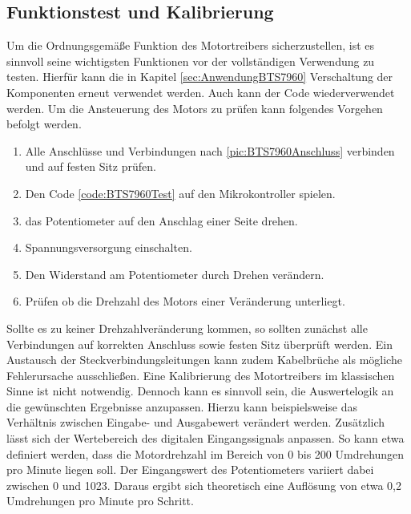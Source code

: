 \begin{center}
	\label{code:BTS7960Test}
\end{center}

\subsection{Funktionstest und Kalibrierung }
Um die Ordnungsgemäße Funktion des Motortreibers sicherzustellen, ist es sinnvoll seine wichtigsten Funktionen vor der vollständigen Verwendung zu testen. Hierfür kann die in Kapitel \ref{sec:AnwendungBTS7960} Verschaltung der Komponenten erneut verwendet werden. Auch kann der Code wiederverwendet werden. Um die Ansteuerung des Motors zu prüfen kann folgendes Vorgehen befolgt werden. 


\begin{center}
	\begin{enumerate}
		\item Alle Anschlüsse und Verbindungen nach \ref{pic:BTS7960Anschluss} verbinden und auf festen Sitz prüfen. 
		\item Den Code \ref{code:BTS7960Test} auf den Mikrokontroller spielen. 
		\item das Potentiometer auf den Anschlag einer Seite drehen. 
		\item Spannungsversorgung einschalten.  
		\item Den Widerstand am Potentiometer durch Drehen verändern. 
		\item Prüfen ob die Drehzahl des Motors einer Veränderung unterliegt. 
	\end{enumerate}  
\end{center}
Sollte es zu keiner Drehzahlveränderung kommen, so sollten zunächst alle Verbindungen auf korrekten Anschluss sowie festen Sitz überprüft werden. Ein Austausch der Steckverbindungsleitungen kann zudem Kabelbrüche als mögliche Fehlerursache ausschließen.
Eine Kalibrierung des Motortreibers im klassischen Sinne ist nicht notwendig. Dennoch kann es sinnvoll sein, die Auswertelogik an die gewünschten Ergebnisse anzupassen. Hierzu kann beispielsweise das Verhältnis zwischen Eingabe- und Ausgabewert verändert werden. Zusätzlich lässt sich der Wertebereich des digitalen Eingangssignals anpassen.
So kann etwa definiert werden, dass die Motordrehzahl im Bereich von 0 bis 200 Umdrehungen pro Minute liegen soll. Der Eingangswert des Potentiometers variiert dabei zwischen 0 und 1023. Daraus ergibt sich theoretisch eine Auflösung von etwa 0,2 Umdrehungen pro Minute pro Schritt.
